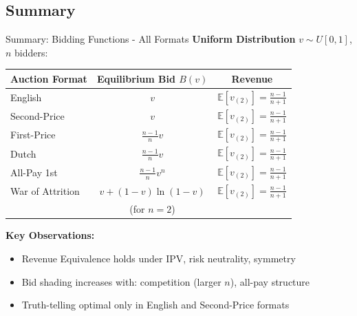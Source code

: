 \documentclass[xcolor={x11names}]{beamer}
\begin{document}
\subsection{Summary}
\begin{frame}{Summary: Bidding Functions - All Formats}
\textbf{Uniform Distribution} $v \sim U[0,1]$, $n$ bidders:

\begin{center}
\begin{tabular}{lcc}
\toprule
\textbf{Auction Format} & \textbf{Equilibrium Bid} $B(v)$ & \textbf{Revenue} \\
\midrule
English & $v$ & $\mathbb{E}[v_{(2)}] = \frac{n-1}{n+1}$ \\[0.2cm]
Second-Price & $v$ & $\mathbb{E}[v_{(2)}] = \frac{n-1}{n+1}$ \\[0.2cm]
First-Price & $\frac{n-1}{n}v$ & $\mathbb{E}[v_{(2)}] = \frac{n-1}{n+1}$ \\[0.2cm]
Dutch & $\frac{n-1}{n}v$ & $\mathbb{E}[v_{(2)}] = \frac{n-1}{n+1}$ \\[0.2cm]
All-Pay 1st & $\frac{n-1}{n}v^n$ & $\mathbb{E}[v_{(2)}] = \frac{n-1}{n+1}$ \\[0.2cm]
War of Attrition & $v + (1-v)\ln(1-v)$ & $\mathbb{E}[v_{(2)}] = \frac{n-1}{n+1}$ \\
& (for $n=2$) & \\
\bottomrule
\end{tabular}
\end{center}


\textbf{Key Observations:}
\begin{itemize}
  \item Revenue Equivalence holds under IPV, risk neutrality, symmetry
  \item Bid shading increases with: competition (larger $n$), all-pay structure
  \item Truth-telling optimal only in English and Second-Price formats
\end{itemize}
\end{frame}
\end{document}
